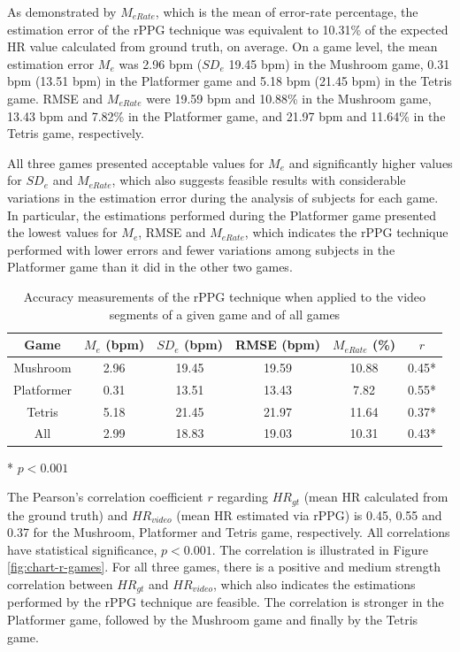 As demonstrated by $M_{eRate}$, which is the mean of error-rate percentage, the estimation error of the rPPG technique was equivalent to 10.31\% of the expected HR value calculated from ground truth, on average. On a game level, the mean estimation error $M_e$ was 2.96 bpm ($SD_e$ 19.45 bpm) in the Mushroom game, 0.31 bpm (13.51 bpm) in the Platformer game and 5.18 bpm (21.45 bpm) in the Tetris game. RMSE and $M_{eRate}$ were 19.59 bpm and 10.88\% in the Mushroom game, 13.43 bpm and 7.82\% in the Platformer game, and 21.97 bpm and 11.64\% in the Tetris game, respectively.

All three games presented acceptable values for $M_e$ and significantly higher values for $SD_e$ and $M_{eRate}$, which also suggests feasible results with considerable variations in the estimation error during the analysis of subjects for each game. In particular, the estimations performed during the Platformer game presented the lowest values for $M_e$, RMSE and $M_{eRate}$, which indicates the rPPG technique performed with lower errors and fewer variations among subjects in the Platformer game than it did in the other two games.

\begin{table}[!h]
\begin{threeparttable}
  \begin{tabular}{cccccc}%
  \toprule
     Game & $M_e$ (bpm) & $SD_e$ (bpm) & RMSE (bpm) & $M_{eRate}$ (\%) & $r$ \\
  \midrule
      Mushroom & 2.96 & 19.45 & 19.59 & 10.88 & 0.45* \\
      Platformer & 0.31 & 13.51 & 13.43 & 7.82 & 0.55* \\
      Tetris & 5.18 & 21.45 & 21.97 & 11.64 & 0.37* \\
      All & 2.99 & 18.83 & 19.03 & 10.31 & 0.43* \\
  \bottomrule
  \end{tabular}
  \begin{tablenotes}
    \small
    \item[*]{$p < 0.001$}
  \end{tablenotes}
\end{threeparttable}
\caption{Accuracy measurements of the rPPG technique when applied to the video segments of a given game and of all games}
\label{table:rppg-validation-games}
\end{table}

The Pearson's correlation coefficient $r$ regarding $HR_{gt}$ (mean HR calculated from the ground truth) and $HR_{video}$ (mean HR estimated via rPPG) is 0.45, 0.55 and 0.37 for the Mushroom, Platformer and Tetris game, respectively. All correlations have statistical significance, $p < 0.001$. The correlation is illustrated in Figure \ref{fig:chart-r-games}. For all three games, there is a positive and medium strength correlation between $HR_{gt}$ and $HR_{video}$, which also indicates the estimations performed by the rPPG technique are feasible. The correlation is stronger in the Platformer game, followed by the Mushroom game and finally by the Tetris game.

